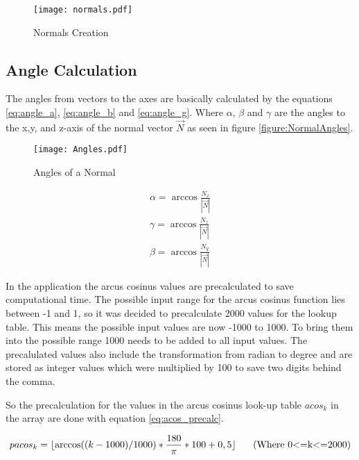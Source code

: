 \begin{figure}[H]
\begin{center}
  \texttt{[image: normals.pdf]}
  \caption{Normals Creation}
  \label{figure:normals}
\end{center}
\end{figure}

\subsection{Angle Calculation}

The angles from vectors to the axes are basically calculated by the equations \ref{eq:angle_a}, \ref{eq:angle_b} and
\vref{eq:angle_g}. Where $\alpha$, $\beta$ and $\gamma$ are the angles to the x,y, and z-axis 
of the normal vector $\vec{N}$ as seen in figure \vref{figure:NormalAngles}.

\begin{figure}[H]
\begin{center}
  \texttt{[image: Angles.pdf]}
  \caption{Angles of a Normal}
  \label{figure:NormalAngles}
\end{center} 
\end{figure}

\begin{align}
 \alpha = \arccos \frac{N_x}{\left|\vec{N}\right|}  
\label{eq:angle_a}\\
 \gamma = \arccos \frac{N_z}{\left|\vec{N}\right|}  
\label{eq:angle_b}\\
 \beta  = \arccos \frac{N_y}{\left|\vec{N}\right|}  
\label{eq:angle_g}
\end{align}


In the application the arcus cosinus values are precalculated to save computational time.
The possible input range for the arcus cosinus function lies between -1 and 1, so it was decided
to precalculate 2000 values for the lookup table. This means the possible input values are now
-1000 to 1000. To bring them into the possible range 1000 needs to be added to all input values.
The precalulated values also include the transformation from radian to degree and are stored as 
integer values which were multiplied by 100 to save two digits behind the comma.

So the precalculation for the values in the arcus cosinus look-up table $acos_k$ 
in the array are done with equation \vref{eq:acos_precalc}.

\begin{equation}
	pacos_k=\lfloor \arccos ((k-1000)/1000) * \frac{180}{\pi}*100 + 0,5 \rfloor
	\mbox{\hspace{0.5cm} (Where 0<=k<=2000)}
	\label{eq:acos_precalc}
\end{equation}

